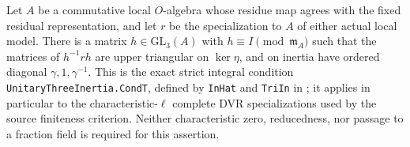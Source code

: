 \begin{theorem}
\label{AC-G57-integral}
Let $A$ be a commutative local $O$-algebra whose residue map
agrees with the fixed residual representation, and let $r$
be the specialization to $A$ of either actual local model.
There is a matrix $h\in\mathrm{GL}_3(A)$ with
$h\equiv I\pmod{\mathfrak m_A}$ such that the matrices of
$h^{-1}rh$ are upper triangular on $\ker\eta$, and on
inertia have ordered diagonal
$\gamma,1,\gamma^{-1}$.
This is the exact strict integral condition
\texttt{UnitaryThreeInertia.CondT}, defined by
\texttt{InHat} and \texttt{TriIn} in
; it applies in particular
to the characteristic-$\ell$ complete DVR specializations
used by the source finiteness criterion.  Neither
characteristic zero, reducedness, nor passage to a
fraction field is required for this assertion.
\end{theorem}
